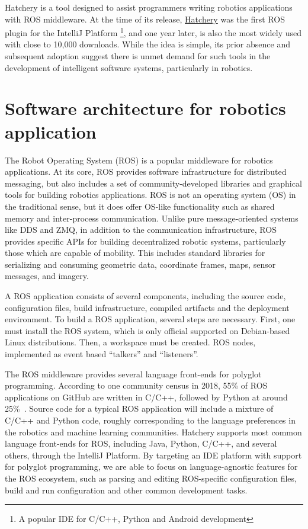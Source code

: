 \documentclass[12pt,initial,twoside,maitrise]{dms}
\numberwithin{equation}{section}
\numberwithin{table}{chapter}
\numberwithin{figure}{chapter}
\begin{document}
Hatchery is a tool designed to assist programmers writing robotics applications with ROS middleware. At the time of its release, \href{https://github.com/duckietown/hatchery}{Hatchery} was the first ROS plugin for the IntelliJ Platform \footnote{A popular IDE for C/C++, Python and Android development}, and one year later, is also the most widely used with close to 10,000 downloads. While the idea is simple, its prior absence and subsequent adoption suggest there is unmet demand for such tools in the development of intelligent software systems, particularly in robotics.

\section{Software architecture for robotics application}

The Robot Operating System (ROS) is a popular middleware for robotics applications. At its core, ROS provides software infrastructure for distributed messaging, but also includes a set of community-developed libraries and graphical tools for building robotics applications. ROS is not an operating system (OS) in the traditional sense, but it does offer OS-like functionality such as shared memory and inter-process communication. Unlike pure message-oriented systems like DDS and ZMQ, in addition to the communication infrastructure, ROS provides specific APIs for building decentralized robotic systems, particularly those which are capable of mobility. This includes standard libraries for serializing and consuming geometric data, coordinate frames, maps, sensor messages, and imagery.

A ROS application consists of several components, including the source code, configuration files, build infrastructure, compiled artifacts and the deployment environment. To build a ROS application, several steps are necessary. First, one must install the ROS system, which is only official supported on Debian-based Linux distributions. Then, a workspace must be created. ROS nodes, implemented as event based ``talkers'' and ``listeners''.

The ROS middleware provides several language front-ends for polyglot programming. According to one community census in 2018, 55\% of ROS applications on GitHub are written in C/C++, followed by Python at around 25\%~\cite{Areserio54:online}. Source code for a typical ROS application will include a mixture of C/C++ and Python code, roughly corresponding to the language preferences in the robotics and machine learning communities. Hatchery supports most common language front-ends for ROS, including Java, Python, C/C++, and several others, through the IntelliJ Platform. By targeting an IDE platform with support for polyglot programming, we are able to focus on language-agnostic features for the ROS ecosystem, such as parsing and editing ROS-specific configuration files, build and run configuration and other common development tasks.
\end{document}
